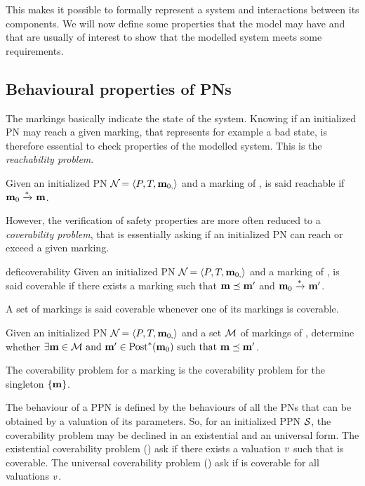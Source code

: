 This makes it possible to formally represent a system and interactions between its components.
We will now define some properties that the model may have and that are usually of interest to show that the modelled system meets some requirements.

\subsection{Behavioural properties of \acp{PN}}

The markings basically indicate the state of the system.
Knowing if an initialized \ac{PN} may reach a given marking, that represents for example a bad state, is therefore essential to check properties of the modelled system.
This is the \emph{reachability problem}.

\begin{defi}[Reachability]
  Given an initialized \ac{PN} $\mathcal{N}_{} = \left\langle P_{}, T_{}, \mathbf{m}_{0,}\right\rangle$ and a marking \mar of \namePN, \mar is said reachable if $\mathbf{m}_0 \xrightarrow{*}_{} \mathbf{m}$.
\end{defi}

However, the verification of safety properties are more often reduced to a \emph{coverability problem}, that is essentially asking if an initialized \ac{PN} can reach or exceed a given marking.

\begin{restatable}[Coverability]{defi}{coverability}
  Given an initialized \ac{PN} $\mathcal{N}_{} = \left\langle P_{}, T_{}, \mathbf{m}_{0,}\right\rangle$ and a marking \mar of \namePN, \mar is said coverable if there exists a marking \marp such that $\mathbf{m} \preceq \mathbf{m'}$ and $\mathbf{m}_0 \xrightarrow{*}_{} \mathbf{m'}$.

  A set of markings is said coverable whenever one of its markings is coverable.
\end{restatable}

\begin{defi}
  Given an initialized \ac{PN} $\mathcal{N}_{} = \left\langle P_{}, T_{}, \mathbf{m}_{0,}\right\rangle$ and a set $\mathcal{M}$ of markings of \namePN, determine whether $\exists \mathbf{m} \in \mathcal{M} \text{ and } \mathbf{m'} \in \operatorname{Post}^*_{}(\mathbf{m}_0) \text{ such that } \mathbf{m} \preceq \mathbf{m'}$.

  The coverability problem for a marking \mar is the coverability problem for the singleton $\{\mathbf{m}\}$.
\end{defi}

The behaviour of a \ac{PPN} is defined by the behaviours of all the \acp{PN} that can be obtained by a valuation of its parameters.
So, for an initialized \ac{PPN} $\mathcal{S}_{}$, the coverability problem may be declined in an existential and an universal form.
The existential coverability problem (\Ecov) ask if there exists a valuation $\val$ such that \mar is coverable.
The universal coverability problem (\Ucov) ask if \mar is coverable for all valuations $\val$.

